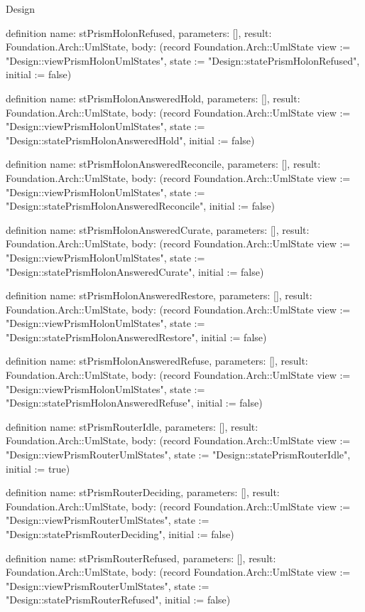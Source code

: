 \begin{lexlean}{Design}
\begin{semanticmodule}
definition{
  name: stPrismHolonRefused,
  parameters: [],
  result: Foundation.Arch::UmlState,
  body: (record Foundation.Arch::UmlState {view := "Design::viewPrismHolonUmlStates", state := "Design::statePrismHolonRefused", initial := false})
}

definition{
  name: stPrismHolonAnsweredHold,
  parameters: [],
  result: Foundation.Arch::UmlState,
  body: (record Foundation.Arch::UmlState {view := "Design::viewPrismHolonUmlStates", state := "Design::statePrismHolonAnsweredHold", initial := false})
}

definition{
  name: stPrismHolonAnsweredReconcile,
  parameters: [],
  result: Foundation.Arch::UmlState,
  body: (record Foundation.Arch::UmlState {view := "Design::viewPrismHolonUmlStates", state := "Design::statePrismHolonAnsweredReconcile", initial := false})
}

definition{
  name: stPrismHolonAnsweredCurate,
  parameters: [],
  result: Foundation.Arch::UmlState,
  body: (record Foundation.Arch::UmlState {view := "Design::viewPrismHolonUmlStates", state := "Design::statePrismHolonAnsweredCurate", initial := false})
}

definition{
  name: stPrismHolonAnsweredRestore,
  parameters: [],
  result: Foundation.Arch::UmlState,
  body: (record Foundation.Arch::UmlState {view := "Design::viewPrismHolonUmlStates", state := "Design::statePrismHolonAnsweredRestore", initial := false})
}

definition{
  name: stPrismHolonAnsweredRefuse,
  parameters: [],
  result: Foundation.Arch::UmlState,
  body: (record Foundation.Arch::UmlState {view := "Design::viewPrismHolonUmlStates", state := "Design::statePrismHolonAnsweredRefuse", initial := false})
}

definition{
  name: stPrismRouterIdle,
  parameters: [],
  result: Foundation.Arch::UmlState,
  body: (record Foundation.Arch::UmlState {view := "Design::viewPrismRouterUmlStates", state := "Design::statePrismRouterIdle", initial := true})
}

definition{
  name: stPrismRouterDeciding,
  parameters: [],
  result: Foundation.Arch::UmlState,
  body: (record Foundation.Arch::UmlState {view := "Design::viewPrismRouterUmlStates", state := "Design::statePrismRouterDeciding", initial := false})
}

definition{
  name: stPrismRouterRefused,
  parameters: [],
  result: Foundation.Arch::UmlState,
  body: (record Foundation.Arch::UmlState {view := "Design::viewPrismRouterUmlStates", state := "Design::statePrismRouterRefused", initial := false})
}


\end{semanticmodule}
\end{lexlean}
